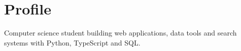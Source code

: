 \section{Profile}
\small{Computer science student building web applications, data tools and search systems with Python, TypeScript and SQL.}
